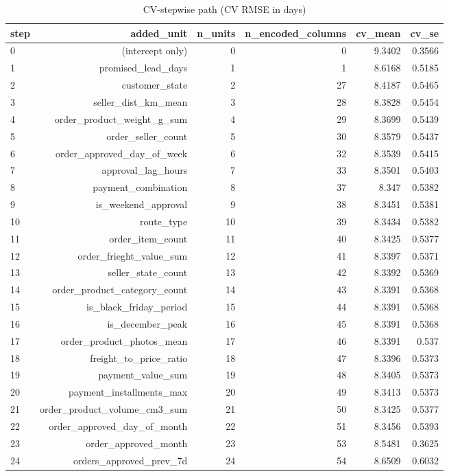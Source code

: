 \begin{table}[htbp]
\centering
\small
\caption{CV-stepwise path (CV RMSE in days)}
\begin{tabular}{lrrrrr}
\toprule
step & added\_unit & n\_units & n\_encoded\_columns & cv\_mean & cv\_se \\
\midrule
0 & (intercept only) & 0 & 0 & 9.3402 & 0.3566 \\
1 & promised\_lead\_days & 1 & 1 & 8.6168 & 0.5185 \\
2 & customer\_state & 2 & 27 & 8.4187 & 0.5465 \\
3 & seller\_dist\_km\_mean & 3 & 28 & 8.3828 & 0.5454 \\
4 & order\_product\_weight\_g\_sum & 4 & 29 & 8.3699 & 0.5439 \\
5 & order\_seller\_count & 5 & 30 & 8.3579 & 0.5437 \\
6 & order\_approved\_day\_of\_week & 6 & 32 & 8.3539 & 0.5415 \\
7 & approval\_lag\_hours & 7 & 33 & 8.3501 & 0.5403 \\
8 & payment\_combination & 8 & 37 & 8.347 & 0.5382 \\
9 & is\_weekend\_approval & 9 & 38 & 8.3451 & 0.5381 \\
10 & route\_type & 10 & 39 & 8.3434 & 0.5382 \\
11 & order\_item\_count & 11 & 40 & 8.3425 & 0.5377 \\
12 & order\_frieght\_value\_sum & 12 & 41 & 8.3397 & 0.5371 \\
13 & seller\_state\_count & 13 & 42 & 8.3392 & 0.5369 \\
14 & order\_product\_category\_count & 14 & 43 & 8.3391 & 0.5368 \\
15 & is\_black\_friday\_period & 15 & 44 & 8.3391 & 0.5368 \\
16 & is\_december\_peak & 16 & 45 & 8.3391 & 0.5368 \\
17 & order\_product\_photos\_mean & 17 & 46 & 8.3391 & 0.537 \\
18 & freight\_to\_price\_ratio & 18 & 47 & 8.3396 & 0.5373 \\
19 & payment\_value\_sum & 19 & 48 & 8.3405 & 0.5373 \\
20 & payment\_installments\_max & 20 & 49 & 8.3413 & 0.5373 \\
21 & order\_product\_volume\_cm3\_sum & 21 & 50 & 8.3425 & 0.5377 \\
22 & order\_approved\_day\_of\_month & 22 & 51 & 8.3456 & 0.5393 \\
23 & order\_approved\_month & 23 & 53 & 8.5481 & 0.3625 \\
24 & orders\_approved\_prev\_7d & 24 & 54 & 8.6509 & 0.6032 \\
\bottomrule
\end{tabular}
\par\smallskip\begin{minipage}{\linewidth}\footnotesize \end{minipage}
\end{table}

